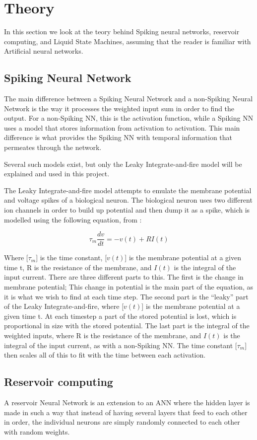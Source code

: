 \section{Theory}

In this section we look at the teory behind Spiking neural networks, reservoir computing, and Liquid State Machines, assuming that the reader is familiar with Artificial neural networks.

\subsection{Spiking Neural Network}

The main difference between a Spiking Neural Network and a non-Spiking Neural Network is the way it processes the weighted input sum in order to find the output. For a non-Spiking NN, this is the activation function, while a Spiking NN uses a model that stores information from activation to activation. This main difference is what provides the Spiking NN with temporal information that permeates through the network.

Several such models exist, but only the Leaky Integrate-and-fire model \cite{Leaky} will be explained and used in this project.

The Leaky Integrate-and-fire model attempts to emulate the membrane potential and voltage spikes of a biological neuron. The biological neuron uses two different ion channels in order to build up potential and then dump it as a spike, which is modelled using the following equation, from \cite{leaky}:

\begin{equation}
\tau_m\frac{dv}{dt} = -v(t) + RI(t)
\end{equation}

Where [$\tau_m$] is the time constant, [$v(t)$] is the membrane potential at a given time t, R is the resistance of the membrane, and $I(t)$ is the integral of the input current.
There are three different parts to this. The first is the change in membrane potential; This change in potential is the main part of the equation, as it is what we wish to find at each time step. The second part is the ``leaky'' part of the Leaky Integrate-and-fire, where [$v(t)$] is the membrane potential at a given time t. At each timestep a part of the stored potential is lost, which is proportional in size with the stored potential. The last part is the integral of the weighted inputs, where R is the resistance of the membrane, and $I(t)$ is the integral of the input current, as with a non-Spiking NN. The time constant [$\tau_m$] then scales all of this to fit with the time between each activation.

\subsection{Reservoir computing}

A reservoir Neural Network is an extension to an ANN where the hidden layer is made in such a way that instead of having several layers that feed to each other in order, the individual neurons are simply randomly connected to each other with random weights.